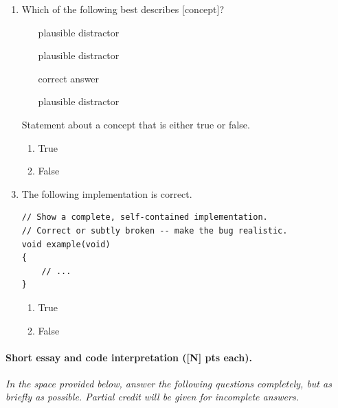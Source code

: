\documentclass{article}
\newif\ifanswers
\begin{document}
\begin{enumerate}

\item Which of the following best describes [concept]?
\ifanswers\quad\textbf{Answer: c}\fi
\begin{enumerate}[label=\alph*.]
  \item [plausible distractor]
  \item [plausible distractor]
  \item [correct answer]
  \item [plausible distractor]
\end{enumerate}

\item [Statement about a concept that is either true or false.]
\ifanswers\quad\textbf{Answer: a (True)}\fi
\begin{enumerate}[label=\alph*.]
  \item True
  \item False
\end{enumerate}

\item The following implementation is correct.
\ifanswers\quad\textbf{Answer: b --- [describe the specific bug]}\fi
\begin{lstlisting}
// Show a complete, self-contained implementation.
// Correct or subtly broken -- make the bug realistic.
void example(void)
{
    // ...
}
\end{lstlisting}
\begin{enumerate}[label=\alph*.]
  \item True
  \item False
\end{enumerate}

\newpage

\end{enumerate}


\paragraph*{Short essay and code interpretation ([N] pts each).}
\textit{In the space provided below, answer the following questions completely,
but as briefly as possible.
Partial credit will be given for incomplete answers.}
\end{document}
